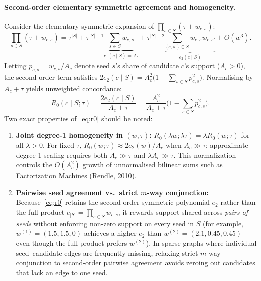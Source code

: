 \paragraph{Second-order elementary symmetric agreement and homogeneity.}
Consider the elementary symmetric expansion of $\prod_{s\in S} (\tau + w_{c,s})$:
\begin{equation}
  \prod_{s\in S} (\tau + w_{c,s})
  = \tau^{|S|} + \tau^{|S|-1}\underbrace{\sum_{s\in S} w_{c,s}}_{e_1(c\mid S) = A_c}
    + \tau^{|S|-2}\underbrace{\sum_{\{s,s'\}\subset S} w_{c,s}w_{c,s'}}_{e_2(c\mid S)} + O(w^3).
  \label{eq:poe}
\end{equation}
Letting $p_{c,s} = w_{c,s} / A_c$ denote seed $s$'s share of candidate $c$'s support ($A_c > 0$), the second-order
term satisfies $2e_2(c\mid S) = A_c^2\big(1 - \sum_{s\in S} p_{c,s}^2\big)$. Normalising by $A_c + \tau$ yields
unweighted concordance:
\begin{equation}
  R_0(c\mid S;\tau) = \frac{2e_2(c\mid S)}{A_c + \tau}
  = \frac{A_c^2}{A_c + \tau}\Big(1 - \sum_{s\in S} p_{c,s}^2\Big).
  \label{eq:r0}
\end{equation}
Two exact properties of~\eqref{eq:r0} should be noted:
\begin{enumerate}\itemsep1pt
  \item \textbf{Joint degree-1 homogeneity in $(w,\tau)$:} $R_0(\lambda w;\lambda\tau) = \lambda R_0(w;\tau)$ for
  all $\lambda > 0$. For fixed $\tau$, $R_0(w;\tau)\approx 2e_2(w)/A_c$ when $A_c\gg\tau$;
  approximate degree-1 scaling requires both $A_c\gg\tau$ and $\lambda A_c\gg\tau$.
  This normalization controls the $O(A_c^2)$ growth of unnormalised bilinear sums such as
  Factorization Machines (Rendle, 2010).
  \item \textbf{Pairwise seed agreement vs.\ strict $m$-way conjunction:} Because~\eqref{eq:r0} retains the
  second-order symmetric polynomial $e_2$ rather than the full product $e_{|S|}=\prod_{s\in S} w_{c,s}$, it
  rewards support shared across \emph{pairs of seeds} without enforcing non-zero support on every seed in $S$
  (for example, $w^{(1)}=(1.5,1.5,0)$ achieves a higher $e_2$ than $w^{(2)}=(2.1,0.45,0.45)$ even though the full
  product prefers $w^{(2)}$). In sparse graphs where individual seed--candidate edges are frequently missing,
  relaxing strict $m$-way conjunction to second-order pairwise agreement avoids zeroing out candidates that lack an
  edge to one seed.
\end{enumerate}

